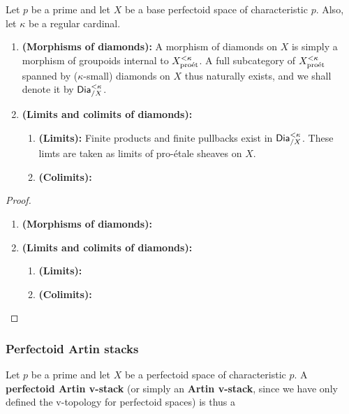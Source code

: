                 \begin{proposition} \label{prop: categories_of_diamonds}
                    Let $p$ be a prime and let $X$ be a base perfectoid space of characteristic $p$. Also, let $\kappa$ be a regular cardinal.
                        \begin{enumerate}
                            \item \textbf{(Morphisms of diamonds):} A morphism of diamonds on $X$ is simply a morphism of groupoids internal to $X_{\mathrm{pro\acute{e}t}}^{< \kappa}$. A full subcategory of $X_{\mathrm{pro\acute{e}t}}^{< \kappa}$ spanned by ($\kappa$-small) diamonds on $X$ thus naturally exists, and we shall denote it by $\mathsf{Dia}_{/X}^{< \kappa}$. 
                            \item \textbf{(Limits and colimits of diamonds):}
                                \begin{enumerate}
                                    \item \textbf{(Limits):} Finite products and finite pullbacks exist in $\mathsf{Dia}_{/X}^{< \kappa}$. These limts are taken as limits of pro-\'etale sheaves on $X$. 
                                    \item \textbf{(Colimits):} 
                                \end{enumerate}
                        \end{enumerate}
                \end{proposition}
                    \begin{proof}
                        \noindent
                        \begin{enumerate}
                            \item \textbf{(Morphisms of diamonds):}
                            \item \textbf{(Limits and colimits of diamonds):}
                                \begin{enumerate}
                                    \item \textbf{(Limits):}
                                    \item \textbf{(Colimits):}
                                \end{enumerate}
                        \end{enumerate}
                    \end{proof}
            
            \subsubsection{Perfectoid Artin stacks}
                \begin{definition} \label{def: perfectoid_artin_stacks} 
                    Let $p$ be a prime and let $X$ be a perfectoid space of characteristic $p$. A \textbf{perfectoid Artin v-stack} (or simply an \textbf{Artin v-stack}, since we have only defined the v-topology for perfectoid spaces) is thus a 
                \end{definition}
                
